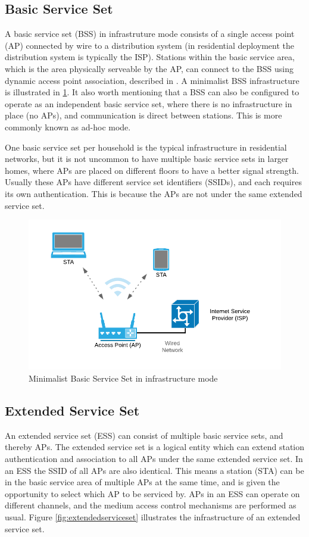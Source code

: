 		\subsection{Basic Service Set}
		A basic service set (BSS) in infrastruture mode consists of a single access point (AP) connected by wire to a distribution system (in residential deployment the distribution system is typically the ISP).
		Stations within the basic service area, which is the area physically serveable by the AP, can connect to the BSS using dynamic access point association, described
		in \cite{std80211}. A minimalist BSS infrastructure is illustrated in \ref{fig:basicserviceset}. It also worth mentioning that a BSS can also be configured to operate as an independent
		basic service set, where there is no infrastructure in place (no APs), and communication is direct between stations. This is more commonly known as ad-hoc mode.
		
		One basic service set per household is the typical infrastructure in residential networks, but it is not uncommon to have multiple basic service sets in larger homes,
		where APs are placed on different floors to have a better signal strength. Usually these APs have different service set identifiers (SSIDs), and each requires its own authentication.
		This is because the APs are not under the same extended service set. 

		 \begin{figure}
			 \center
			 \includegraphics[scale=0.35]{Images/BSS.png}
			 \caption{Minimalist Basic Service Set in infrastructure mode}
			 \label{fig:basicserviceset}
		 \end{figure}

		\subsection{Extended Service Set}
		An extended service set (ESS) can consist of multiple basic service sets, and thereby APs. The extended service set is a logical entity which can extend station
		authentication and association to all APs under the same extended service set. In an ESS the SSID of all APs are also identical. This means a station (STA) can be in the basic service area of
		multiple APs at the same time, and is given the opportunity to select which AP to be serviced by. APs in an ESS can operate on different channels, and the medium access control
		mechanisms are performed as usual. Figure \ref{fig:extendedserviceset} illustrates the infrastructure of an extended service set.  

